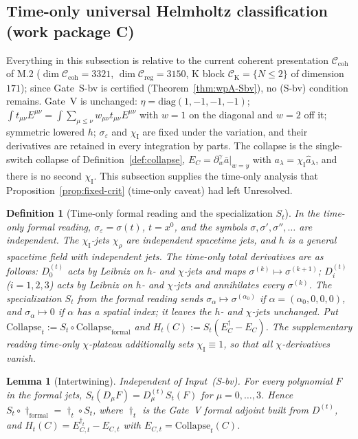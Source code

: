 \documentclass{article}
\newtheorem{lemma}[proposition]{Lemma}
\newtheorem{definition}[proposition]{Definition}
\theoremstyle{remark}
\newcommand{\sigeps}{\sigma_\varepsilon}
\newcommand{\chiI}{\chi_{\mathrm I}}
\newcommand{\Ccoh}{\mathcal C_{\mathrm{coh}}}
\newcommand{\Creg}{\mathcal C_{\mathrm{reg}}}
\newcommand{\Coll}{\mathrm{Collapse}}
\begin{document}
\subsection{Time-only universal Helmholtz classification (work package C)}
\label{sec:to-timeonly}

Everything in this subsection is relative to the current coherent presentation $\Ccoh$ of M.2 ($\dim\Ccoh=3321$, $\dim\Creg=3150$, K block $\mathcal C_{\mathrm K}=\{N\le2\}$ of dimension $171$); since Gate~S-bv is certified (Theorem~\ref{thm:wpA-Sbv}), no (S-bv) condition remains.
Gate~V is unchanged: $\eta=\mathrm{diag}(1,-1,-1,-1)$; $\int t_{\mu\nu}E^{\mu\nu}=\int\sum_{\mu\le\nu}w_{\mu\nu}t_{\mu\nu}E^{\mu\nu}$ with $w=1$ on the diagonal and $w=2$ off it; symmetric lowered $h$; $\sigeps$ and $\chiI$ are fixed under the variation, and their derivatives are retained in every integration by parts.
The collapse is the single-switch collapse of Definition~\ref{def:collapse}, $E_C=\partial_w^\gamma\bar a|_{w=y}$ with $a_\lambda=\chiI\hat a_\lambda$, and there is no second $\chiI$.
This subsection supplies the time-only analysis that Proposition~\ref{prop:fixed-crit} (time-only caveat) had left Unresolved.

\begin{definition}[Time-only formal reading and the specialization $S_t$]
\label{def:to-timeonly}
In the \emph{time-only formal} reading, $\sigeps=\sigma(t)$, $t=x^0$, and the symbols $\sigma,\sigma',\sigma'',\dots$ are independent.
The $\chiI$-jets $\chi_\rho$ are independent spacetime jets, and $h$ is a general spacetime field with independent jets.
The time-only total derivatives are as follows: $D_0^{(t)}$ acts by Leibniz on $h$- and $\chi$-jets and maps $\sigma^{(k)}\mapsto\sigma^{(k+1)}$; $D_i^{(t)}$ ($i=1,2,3$) acts by Leibniz on $h$- and $\chi$-jets and annihilates every $\sigma^{(k)}$.
The specialization $S_t$ from the formal reading sends $\sigma_\alpha\mapsto\sigma^{(\alpha_0)}$ if $\alpha=(\alpha_0,0,0,0)$, and $\sigma_\alpha\mapsto0$ if $\alpha$ has a spatial index; it leaves the $h$- and $\chi$-jets unchanged.
Put $\Coll_t:=S_t\circ\Coll_{\mathrm{formal}}$ and $H_t(C):=S_t(E_C^\dagger-E_C)$.
The supplementary reading \emph{time-only $\chi$-plateau} additionally sets $\chiI\equiv1$, so that all $\chi$-derivatives vanish.
\end{definition}

\begin{lemma}[Intertwining]
\label{lem:to-intertwine}
Independent of Input~(S-bv).
For every polynomial $F$ in the formal jets, $S_t(D_\mu F)=D_\mu^{(t)}S_t(F)$ for $\mu=0,\dots,3$.
Hence $S_t\circ\dagger_{\mathrm{formal}}=\dagger_t\circ S_t$, where $\dagger_t$ is the Gate~V formal adjoint built from $D^{(t)}$, and $H_t(C)=E_{C,t}^{\dagger_t}-E_{C,t}$ with $E_{C,t}=\Coll_t(C)$.
\end{lemma}
\end{document}
